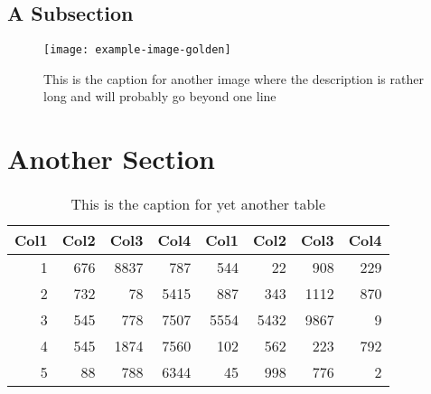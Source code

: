\subsection{A Subsection}
    \lipsum[6-8]
    \begin{figure}
        \centering
        \texttt{[image: example-image-golden]}
        \captionsetup{width=4.5in}
        \caption{This is the caption for another image where the description is rather long and will probably go beyond one line}
    \end{figure}

\section{Another Section}
    \lipsum[1-2]
    \begin{table}
        \centering
        \begin{tabular}{r r r r r r r r}
             Col1 & Col2 & Col3 & Col4 & Col1 & Col2 & Col3 & Col4 \\
             \hline
             1    & 676  & 8837 & 787  & 544  & 22   & 908  & 229  \\
             2    & 732  & 78   & 5415 & 887  & 343  & 1112 & 870  \\
             3    & 545  & 778  & 7507 & 5554 & 5432 & 9867 & 9    \\
             4    & 545  & 1874 & 7560 & 102  & 562  & 223  & 792  \\
             5    & 88   & 788  & 6344 & 45   & 998  & 776  & 2    \\
             \hline
        \end{tabular}
        \captionsetup{width=3.9in}
        \caption{This is the caption for yet another table}
    \end{table}

